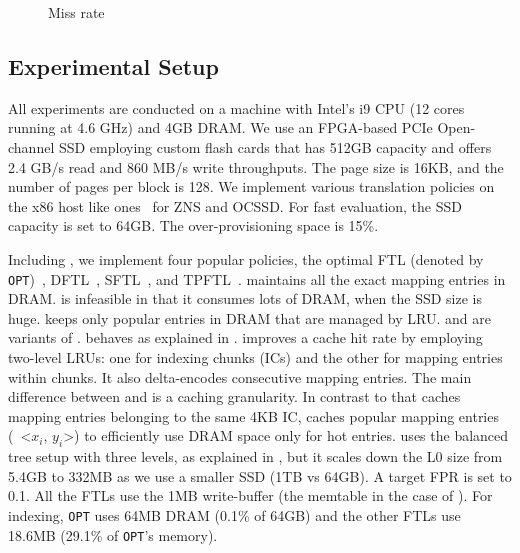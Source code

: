 \begin{figure}[t]
\begin{minipage}[c]{0.28\textwidth}
            \vspace{-2pt}
   	        \caption{Miss rate}
            \vspace{-5pt}
            \label{fig:miss-ratio}
    \end{minipage}
    \vspace{-5pt}
\end{figure}
\subsection{Experimental Setup}
\label{sec:exp:setup}

All experiments are conducted on a machine with Intel's i9 CPU (12
cores running at 4.6 GHz) and 4GB DRAM. We use an FPGA-based PCIe
Open-channel SSD employing custom flash cards that has 512GB capacity
and offers
2.4 GB/s read and 860 MB/s write throughputs.
The page size is 16KB,
and the number of pages per block is 128.  
We implement various translation policies on the x86 host like
ones~\cite{dm-zoned, ocssd} for ZNS and OCSSD. 
For fast evaluation, the SSD capacity is set to
64GB.  The over-provisioning space is 15\%.

Including \ours{}, we implement four popular policies, the optimal FTL (denoted
by \texttt{OPT})~\cite{flash-based-ssd
}, DFTL~\cite{dftl}, 
SFTL~\cite{sftl}, and TPFTL~\cite{tpftl}.  
\OPT{} maintains all the exact mapping entries in DRAM.
\OPT{} is infeasible in that it consumes lots of DRAM, when the SSD size is
huge.
\DFTL{} keeps only popular entries in DRAM that are managed by LRU. \SFTL{} and
\TPFTL{} are variants of \DFTL{}.  \SFTL{} behaves as explained in
.  \TPFTL{} improves a cache hit rate by employing
two-level LRUs: one for indexing chunks (ICs) and the other for mapping entries
within chunks.  It also delta-encodes consecutive mapping entries.  The main
difference between  \SFTL{} and \TPFTL{} is a caching granularity. In
contrast to \SFTL{} that caches mapping entries belonging to the same 4KB IC,
\TPFTL{} caches popular mapping entries (\ie~<$x_i$, $y_i$>) to efficiently
use DRAM space only for hot entries.
\OURS{} uses the balanced tree setup with three levels, as explained in
, but it scales down the L0 size from 5.4GB to 332MB
as we use a smaller SSD (1TB vs 64GB).  A target FPR is set to 0.1.  All the
FTLs use the 1MB write-buffer (the memtable in the case of \ours{}).
For indexing, \texttt{OPT} uses 64MB DRAM (0.1\% of 64GB) and
the other FTLs use 18.6MB (29.1\% of \texttt{OPT}'s memory).


